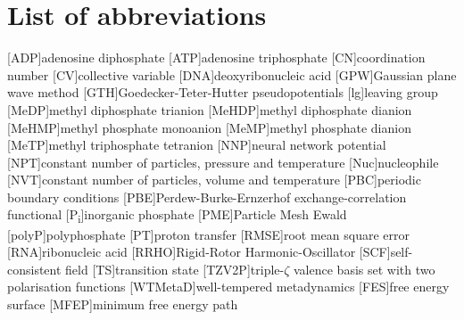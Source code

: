 \chapter*{List of abbreviations}

\begin{acronym}
    [ADP]{adenosine diphosphate}
    [ATP]{adenosine triphosphate}
    [CN]{coordination number}
    [CV]{collective variable}
    [DNA]{deoxyribonucleic acid}
    [GPW]{Gaussian plane wave method}
    [GTH]{Goedecker-Teter-Hutter pseudopotentials}
    [lg]{leaving group}
    [MeDP]{methyl diphosphate trianion}
    [MeHDP]{methyl diphosphate dianion}
    [MeHMP]{methyl phosphate monoanion}
    [MeMP]{methyl phosphate dianion}
    [MeTP]{methyl triphosphate tetranion}
    [NNP]{neural network potential}
    [NPT]{constant number of particles, pressure and temperature}
    [Nuc]{nucleophile}
    [NVT]{constant number of particles, volume and temperature}
    [PBC]{periodic boundary conditions}
    [PBE]{Perdew-Burke-Ernzerhof exchange-correlation functional}
    [P\textsubscript{i}]{inorganic phosphate}
    [PME]{Particle Mesh Ewald}
    [polyP]{polyphosphate}
    [PT]{proton transfer}
    [RMSE]{root mean square error}
    [RNA]{ribonucleic acid}
    [RRHO]{Rigid-Rotor Harmonic-Oscillator}
    [SCF]{self-consistent field}
    [TS]{transition state}
    [TZV2P]{triple-$\zeta$ valence basis set with two polarisation functions}
    [WTMetaD]{well-tempered metadynamics}
    [FES]{free energy surface}
    [MFEP]{minimum free energy path}
\end{acronym}


